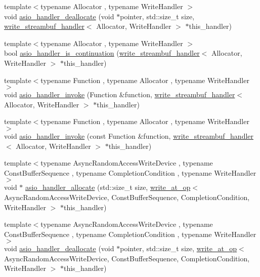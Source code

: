 \begin{DoxyCompactItemize}
\item 
{\footnotesize template$<$typename Allocator , typename Write\+Handler $>$ }\\void \hyperlink{namespaceasio_1_1detail_aece939e8dbc95473d50e841578aad232}{asio\+\_\+handler\+\_\+deallocate} (void $\ast$pointer, std\+::size\+\_\+t size, \hyperlink{classasio_1_1detail_1_1write__streambuf__handler}{write\+\_\+streambuf\+\_\+handler}$<$ Allocator, Write\+Handler $>$ $\ast$this\+\_\+handler)
\item 
{\footnotesize template$<$typename Allocator , typename Write\+Handler $>$ }\\bool \hyperlink{namespaceasio_1_1detail_a59f84f51f5af8026555987079880300b}{asio\+\_\+handler\+\_\+is\+\_\+continuation} (\hyperlink{classasio_1_1detail_1_1write__streambuf__handler}{write\+\_\+streambuf\+\_\+handler}$<$ Allocator, Write\+Handler $>$ $\ast$this\+\_\+handler)
\item 
{\footnotesize template$<$typename Function , typename Allocator , typename Write\+Handler $>$ }\\void \hyperlink{namespaceasio_1_1detail_a53acf786393527e38ae739855e24b2ab}{asio\+\_\+handler\+\_\+invoke} (Function \&function, \hyperlink{classasio_1_1detail_1_1write__streambuf__handler}{write\+\_\+streambuf\+\_\+handler}$<$ Allocator, Write\+Handler $>$ $\ast$this\+\_\+handler)
\item 
{\footnotesize template$<$typename Function , typename Allocator , typename Write\+Handler $>$ }\\void \hyperlink{namespaceasio_1_1detail_af6d395bfb092c56ef3635b7dfd016a67}{asio\+\_\+handler\+\_\+invoke} (const Function \&function, \hyperlink{classasio_1_1detail_1_1write__streambuf__handler}{write\+\_\+streambuf\+\_\+handler}$<$ Allocator, Write\+Handler $>$ $\ast$this\+\_\+handler)
\item 
{\footnotesize template$<$typename Async\+Random\+Access\+Write\+Device , typename Const\+Buffer\+Sequence , typename Completion\+Condition , typename Write\+Handler $>$ }\\void $\ast$ \hyperlink{namespaceasio_1_1detail_a3cacdf04fd012dd08b71c0588b4acb06}{asio\+\_\+handler\+\_\+allocate} (std\+::size\+\_\+t size, \hyperlink{classasio_1_1detail_1_1write__at__op}{write\+\_\+at\+\_\+op}$<$ Async\+Random\+Access\+Write\+Device, Const\+Buffer\+Sequence, Completion\+Condition, Write\+Handler $>$ $\ast$this\+\_\+handler)
\item 
{\footnotesize template$<$typename Async\+Random\+Access\+Write\+Device , typename Const\+Buffer\+Sequence , typename Completion\+Condition , typename Write\+Handler $>$ }\\void \hyperlink{namespaceasio_1_1detail_ab48869c3cfb3c8d6a2c132988531c068}{asio\+\_\+handler\+\_\+deallocate} (void $\ast$pointer, std\+::size\+\_\+t size, \hyperlink{classasio_1_1detail_1_1write__at__op}{write\+\_\+at\+\_\+op}$<$ Async\+Random\+Access\+Write\+Device, Const\+Buffer\+Sequence, Completion\+Condition, Write\+Handler $>$ $\ast$this\+\_\+handler)

\end{DoxyCompactItemize}
